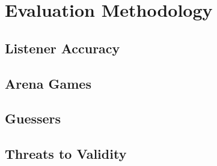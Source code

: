 \section{Evaluation Methodology}\label{sec:evaluation}

\subsection{Listener Accuracy}

\subsection{Arena Games}

\subsection{Guessers}

\subsection{Threats to Validity}
